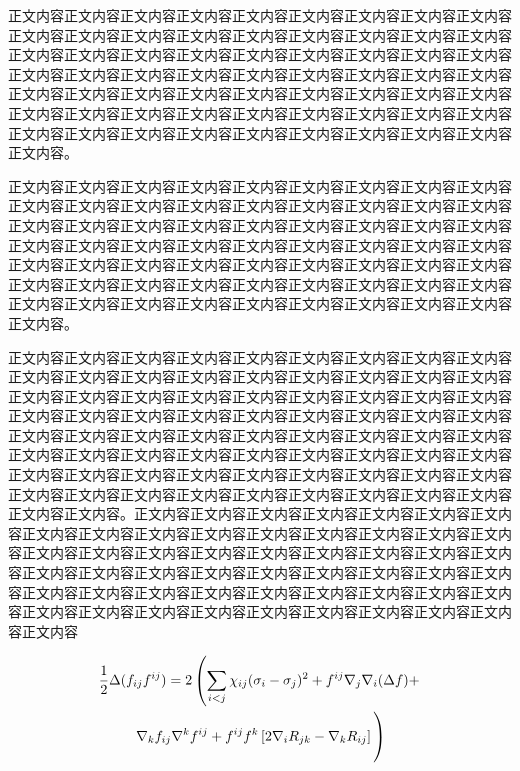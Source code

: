 正文内容\cite{同鸣2012}正文内容正文内容正文内容正文内容正文内容正文内容正文内容正文内容正文内容正文内容正文内容正文内容正文内容正文内容正文内容正文内容正文内容正文内容正文内容正文内容正文内容正文内容正文内容正文内容正文内容正文内容正文内容正文内容正文内容正文内容正文内容正文内容正文内容正文内容正文内容正文内容正文内容正文内容正文内容正文内容正文内容正文内容正文内容正文内容正文内容正文内容正文内容正文内容正文内容正文内容正文内容正文内容正文内容正文内容正文内容正文内容正文内容正文内容正文内容正文内容正文内容正文内容正文内容。

正文内容正文内容正文内容正文内容正文内容正文内容\cite{Boutsidis2011}正文内容正文内容正文内容正文内容正文内容正文内容正文内容正文内容正文内容正文内容正文内容正文内容正文内容正文内容正文内容正文内容正文内容正文内容正文内容正文内容正文内容正文内容正文内容正文内容正文内容正文内容正文内容正文内容正文内容正文内容正文内容正文内容正文内容正文内容正文内容正文内容正文内容正文内容正文内容正文内容正文内容正文内容正文内容正文内容正文内容正文内容正文内容正文内容正文内容正文内容正文内容正文内容正文内容正文内容正文内容正文内容正文内容正文内容。



\citep{同鸣2012}正文内容正文内容\citet{同鸣2012}正文内容正文内容正文内容正文内容\cite{同鸣2012, Lee1999, Tang2013, Ding2006Orthogonal}正文内容正文内容正文内容正文内容正文内容正文内容正文内容正文内容正文内容正文内容正文内容正文内容正文内容正文内容正文内容正文内容正文内容正文内容正文内容正文内容正文内容正文内容正文内容正文内容正文内容正文内容正文内容正文内容正文内容正文内容正文内容正文内容正文内容正文内容正文内容正文内容正文内容正文内容正文内容正文内容正文内容正文内容正文内容正文内容正文内容正文内容正文内容正文内容正文内容正文内容正文内容正文内容正文内容正文内容正文内容正文内容正文内容正文内容正文内容正文内容正文内容正文内容正文内容正文内容正文内容正文内容正文内容正文内容。正文内容正文内容正文内容正文内容正文内容正文内容正文内容正文内容正文内容正文内容正文内容正文内容正文内容正文内容正文内容正文内容正文内容正文内容正文内容正文内容正文内容正文内容正文内容正文内容正文内容正文内容正文内容正文内容正文内容正文内容正文内容正文内容正文内容正文内容正文内容正文内容正文内容正文内容正文内容正文内容正文内容正文内容正文内容正文内容正文内容正文内容正文内容正文内容正文内容正文内容正文内容正文内容正文内容

\begin{multline}
\frac{1}{2}\Delta(f_{ij}f^{ij})=
2\left(\sum_{i<j}\chi_{ij}(\sigma_i-\sigma_j)^2+f^{ij}\nabla_j\nabla_i(\Delta f)+\right .\\
\left .\nabla_kf_{ij}\nabla^kf^{ij}+f^{ij}f^k\left[2\nabla_iR_{jk}-\nabla_kR_{ij}\right]\vphantom{\sum_{i<j}}\right)
\end{multline}

